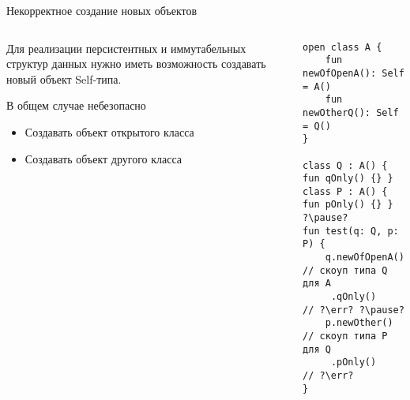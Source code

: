 \documentclass[handout,aspectratio=169,usenames,dvipsnames]{beamer}
\newcommand{\err}[0]{\textcolor{red}{ошибка}}
\begin{document}
    \begin{frame}[fragile]{Некорректное создание новых объектов}
        \begin{columns}[onlytextwidth]
            \begin{column}[t]{0.46\textwidth}
                \vspace{0.5em}

                Для реализации персистентных и иммутабельных структур данных нужно иметь возможность создавать новый объект Self-типа.

                \vspace{1em}
                \begin{block}{В общем случае небезопасно}
                    \begin{itemize}
                        \item Создавать объект открытого класса
                        \item Создавать объект другого класса
                    \end{itemize}
                \end{block}
            \end{column}\hfill%
            \begin{column}[t]{0.50\textwidth}
                \pause
                \begin{verbatim}
open class A {
    fun newOfOpenA(): Self = A()
    fun newOtherQ(): Self = Q()
}

class Q : A() { fun qOnly() {} }
class P : A() { fun pOnly() {} }
?\pause?
fun test(q: Q, p: P) {
    q.newOfOpenA() // скоуп типа Q для A
     .qOnly()      // ?\err? ?\pause?
    p.newOther()   // скоуп типа P для Q
     .pOnly()      // ?\err?
}
                \end{verbatim}
            \end{column}
        \end{columns}
    \end{frame}
\end{document}
